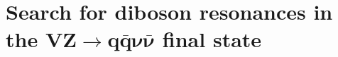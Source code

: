 \documentclass[11pt, a4paper]{book}
\begin{document}
\newpage\null\thispagestyle{empty}\newpage
\thispagestyle{empty}

\frontmatter %
\tableofcontents

\linenumbers




\mainmatter %







\chapter{Search for diboson resonances in the $\mathbf{VZ \rightarrow  q \bar{q} \nu \bar{\nu}}$ final state}
\label{ch:analysis}
















%



\clearpage


%

\end{document}
